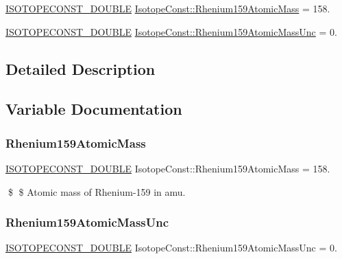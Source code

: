 \begin{DoxyCompactItemize}
\item 
\mbox{\hyperlink{group___isotope_const-_macros_ga8f45a7272ce02c0b4c65c44636ed719a}{I\+S\+O\+T\+O\+P\+E\+C\+O\+N\+S\+T\+\_\+\+D\+O\+U\+B\+LE}} \mbox{\hyperlink{group___isotope_const-_rhenium-_re159_ga300385601d7dfbb1567b08424a0784ec}{Isotope\+Const\+::\+Rhenium159\+Atomic\+Mass}} = 158.
\item 
\mbox{\hyperlink{group___isotope_const-_macros_ga8f45a7272ce02c0b4c65c44636ed719a}{I\+S\+O\+T\+O\+P\+E\+C\+O\+N\+S\+T\+\_\+\+D\+O\+U\+B\+LE}} \mbox{\hyperlink{group___isotope_const-_rhenium-_re159_ga2b3ea9ab47b0f4b03de408c8fc505028}{Isotope\+Const\+::\+Rhenium159\+Atomic\+Mass\+Unc}} = 0.
\end{DoxyCompactItemize}


\subsection{Detailed Description}


\subsection{Variable Documentation}
\mbox{\label{group___isotope_const-_rhenium-_re159_ga300385601d7dfbb1567b08424a0784ec}} 
\subsubsection{\texorpdfstring{Rhenium159\+Atomic\+Mass}{Rhenium159AtomicMass}}
{\footnotesize\ttfamily \mbox{\hyperlink{group___isotope_const-_macros_ga8f45a7272ce02c0b4c65c44636ed719a}{I\+S\+O\+T\+O\+P\+E\+C\+O\+N\+S\+T\+\_\+\+D\+O\+U\+B\+LE}} Isotope\+Const\+::\+Rhenium159\+Atomic\+Mass = 158.}

\$ \$ Atomic mass of Rhenium-\/159 in amu. \mbox{\label{group___isotope_const-_rhenium-_re159_ga2b3ea9ab47b0f4b03de408c8fc505028}} 
\subsubsection{\texorpdfstring{Rhenium159\+Atomic\+Mass\+Unc}{Rhenium159AtomicMassUnc}}
{\footnotesize\ttfamily \mbox{\hyperlink{group___isotope_const-_macros_ga8f45a7272ce02c0b4c65c44636ed719a}{I\+S\+O\+T\+O\+P\+E\+C\+O\+N\+S\+T\+\_\+\+D\+O\+U\+B\+LE}} Isotope\+Const\+::\+Rhenium159\+Atomic\+Mass\+Unc = 0.}


